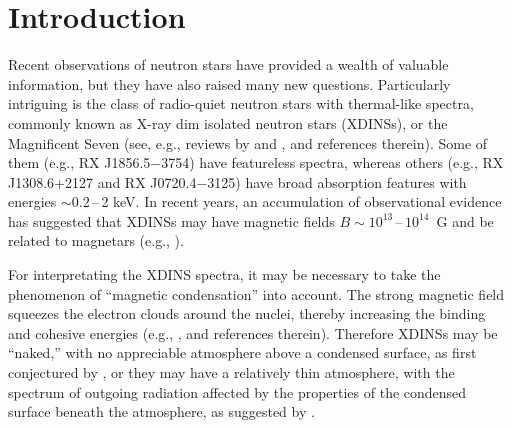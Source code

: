 \documentclass{aa}
\begin{document}
\maketitle

\section{Introduction} 
\label{sect:intro}

Recent observations of neutron stars have provided a wealth
of valuable information, but they have also raised many new
questions. Particularly intriguing is the class of
radio-quiet neutron stars with thermal-like spectra,
commonly known as X-ray dim isolated neutron stars (XDINSs),
or the Magnificent Seven (see, e.g., reviews by
\citealt{Haberl07} and \citealt{Turolla09}, and references
therein). Some of them (e.g., RX J1856.5$-$3754) have
featureless spectra, whereas others (e.g., RX J1308.6+2127
and RX J0720.4$-$3125) have broad absorption features with
energies $\sim0.2$\,--\,2 keV. In recent years,
an accumulation of observational evidence has suggested 
that XDINSs may
have magnetic fields $B\sim10^{13}$\,--\,$10^{14}$~G and be
related to magnetars (e.g., \citealt{Mereghetti08}). 

For interpretating the XDINS spectra, it may be necessary to
take the phenomenon of ``magnetic condensation'' into
account.
The strong magnetic field squeezes the electron clouds around the
nuclei, thereby increasing the binding and cohesive energies
(e.g., \citealp{MedinLai06}, and references therein). Therefore
XDINSs may be ``naked,'' with no appreciable atmosphere above a
condensed surface, as first conjectured by
\citet{ZaneTD02}, or they may have  a
relatively thin atmosphere, with the spectrum of outgoing
radiation affected by the properties of
the condensed surface beneath the atmosphere, 
as suggested by \citet{MotchZH03}.
\end{document}
